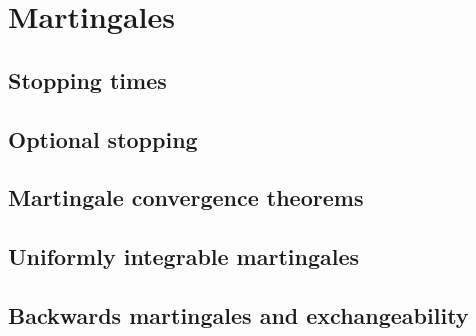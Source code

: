 
\chapter{Martingales}

\section{Stopping times}

\section{Optional stopping}

\section{Martingale convergence theorems}

\section{Uniformly integrable martingales}

\section{Backwards martingales and exchangeability}
